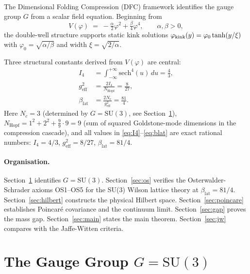 \documentclass[11pt,a4paper]{article}
\begin{document}
The Dimensional Folding Compression (DFC) framework identifies the gauge group
$G$ from a scalar field equation.  Beginning from
\begin{equation}
  V(\varphi) \;=\; -\tfrac{\alpha}{2}\varphi^2 + \tfrac{\beta}{4}\varphi^4,
  \qquad \alpha,\beta>0,
  \label{eq:Vphi}
\end{equation}
the double-well structure supports static kink solutions
$\varphi_{\rm kink}(y) = \varphi_0\tanh(y/\xi)$ with $\varphi_0 = \sqrt{\alpha/\beta}$
and width $\xi = \sqrt{2/\alpha}$.

Three structural constants derived from $V(\varphi)$ are central:
\begin{align}
  I_4 &= \int_{-\infty}^{+\infty} \mathrm{sech}^4(u)\,du = \frac{4}{3},
  \label{eq:I4} \\
  g_{\mathrm{eff}}^2 &= \frac{2I_4}{N_{\mathrm{Hopf}}} = \frac{8}{27},
  \label{eq:geff} \\
  \beta_{\mathrm{lat}} &= \frac{2N_c}{g_{\mathrm{eff}}^2} = \frac{81}{4}.
  \label{eq:blat}
\end{align}
Here $N_c = 3$ (determined by $G = \mathrm{SU}(3)$, see Section~\ref{sec:G}),
$N_{\mathrm{Hopf}} = 1^2 + 2^2 + \tfrac{9}{9}\cdot 9 = 9$ (sum of squared
Goldstone-mode dimensions in the compression cascade), and all values in
\eqref{eq:I4}--\eqref{eq:blat} are exact rational numbers:
$I_4 = 4/3$, $g_{\mathrm{eff}}^2 = 8/27$, $\beta_{\mathrm{lat}} = 81/4$.

\paragraph{Organisation.}
Section~\ref{sec:G} identifies $G = \mathrm{SU}(3)$.
Section~\ref{sec:os} verifies the Osterwalder-Schrader axioms OS1--OS5 for
the SU(3) Wilson lattice theory at $\beta_{\mathrm{lat}} = 81/4$.
Section~\ref{sec:hilbert} constructs the physical Hilbert space.
Section~\ref{sec:poincare} establishes Poincar\'{e} covariance and the
continuum limit.
Section~\ref{sec:gap} proves the mass gap.
Section~\ref{sec:main} states the main theorem.
Section~\ref{sec:jw} compares with the Jaffe-Witten criteria.

\section{The Gauge Group $G = \mathrm{SU}(3)$}
\label{sec:G}
\end{document}
